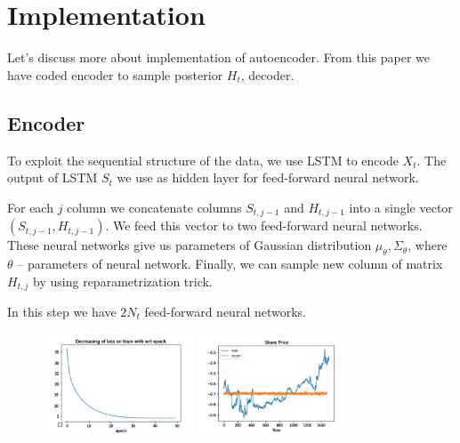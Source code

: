\documentclass{article}
\begin{document}
\section{Implementation}
Let's discuss more about implementation of autoencoder. From this paper we have coded encoder to sample posterior $H_t$, decoder.



\subsection{Encoder}
To exploit the sequential structure of the data, we use LSTM to encode $X_t$. The output of LSTM $S_t$ we use as hidden layer for feed-forward neural network.


For each $j$ column we concatenate columns $S_{t, j-1}$ and $H_{t, j-1}$ into a single vector $(S_{t, j-1}, H_{t, j-1})$. We feed this vector to two feed-forward neural networks. These neural networks give us parameters of Gaussian distribution $\mu_\theta, \Sigma_\theta$, where $\theta$ -- parameters of neural network. Finally, we can sample new column of matrix $H_{t, j}$ by using reparametrization trick. 

In this step we have $2 N_t$ feed-forward neural networks. 
\begin{figure}[h!]
  \begin{center}
    \includegraphics[width=0.4\textwidth]{img.png}
    \includegraphics[width=0.4\textwidth]{img1.png}
  \end{center}
\end{figure}
\end{document}
